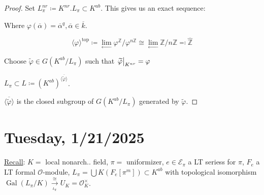\documentclass{article}
\theoremstyle{definition}
\numberwithin{theorem}{subsection}
\begin{document}
    \begin{proof}
        Set \(L_\pi^{nr} \coloneqq K^{nr}.L_\pi \subset K^{ab}\). This gives us an exact sequence:

        \begin{center}
        \end{center}
        
        \begin{center}
        \end{center}

        Where \(\varphi(\overline{\alpha}) = \overline{\alpha}^q, \overline{\alpha} \in \overline{k}\).
        
        \[
            \langle \varphi \rangle ^{\text{top}} \coloneqq \lim_{\leftarrow} \varphi^\mathbb{Z} / \varphi^{n\mathbb{Z}} \cong \lim_{\leftarrow} \mathbb{Z} / n \mathbb{Z} \eqqcolon \widehat{\mathbb{Z}}  
        \]

        Choose \(\widetilde{\varphi} \in G(K^{ab} / L_\pi)\) such that \(\eval{\widetilde{\varphi}}_{K^{nr}} = \varphi\)
        
        \(L_\pi \subset L \coloneqq (K^{ab})^{\overline{\langle \widetilde{\varphi} \rangle } }\).
        
        \(\overline{\langle \widetilde{\varphi} \rangle }\) is the closed subgroup of \(G(K^{ab} / L_{\pi})\) generated by \(\widetilde{\varphi}\). 

    \end{proof}

    \section*{Tuesday, 1/21/2025}
    
    \underline{Recall}: \(K =\) local nonarch.. field, \(\pi =\) uniformizer, \(e \in \mathscr{E}_\pi\) a LT seriess for \(\pi\), \(F_e\) a LT formal \(\mathcal{O}\)-module, \(L_\pi = \bigcup K(F_e[\pi^m]) \subset K^{ab}\) with topological isomorphism \(\operatorname{Gal}(L_\pi / K) \xrightarrow[\iota_\pi]{\cong} U_K = \mathcal{O}_K^\times\).
\end{document}
